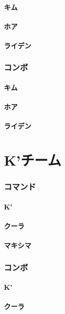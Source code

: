 \documentclass[a4j,11pt]{jarticle}
\begin{document}
\subsection{キム}
\subsection{ホア}
\subsection{ライデン}
\section{コンボ}
\subsection{キム}
\subsection{ホア}
\subsection{ライデン}
\part{K'チーム}%
\section{コマンド}
\subsection{K'}
\subsection{クーラ}
\subsection{マキシマ}
\section{コンボ}
\subsection{K'}
\subsection{クーラ}
\end{document}
